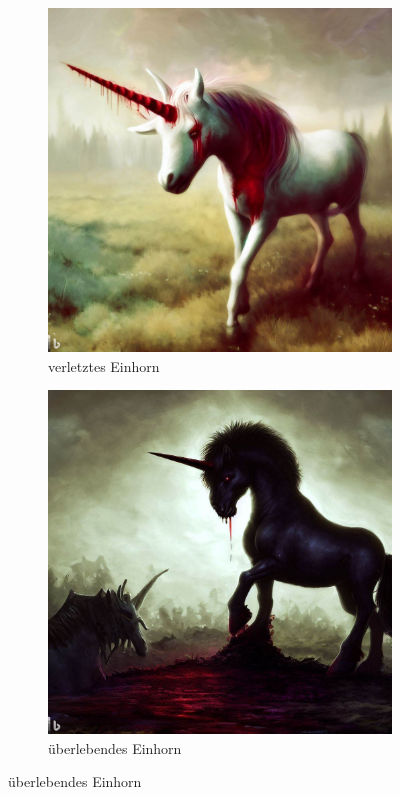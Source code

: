 \documentclass[11pt, twoside]{article}
\begin{document}
\begin{figure}[H]
\begin{subfigure}{0.3\textwidth}
    \includegraphics[width=0.99\linewidth]{unicorn2.jpeg}
    \caption{verletztes Einhorn}
  \end{subfigure}%
  \begin{subfigure}{0.3\textwidth}
    \centering
    \includegraphics[width=0.99\linewidth]{unicorn3.jpeg}
    \caption{überlebendes Einhorn}
  \end{subfigure}
\end{figure}
\end{document}
